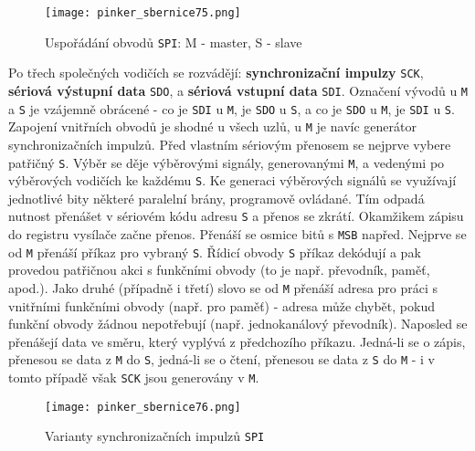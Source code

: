         \begin{figure}[ht!] %
          \centering
          \texttt{[image: pinker\_sbernice75.png]}
          \caption{Uspořádání obvodů \texttt{SPI}: M - master, S - slave}
          \label{MIT:fig_sbernice75}
        \end{figure}
        
        Po třech společných vodičích se rozvádějí: \textbf{synchronizační impulzy} \texttt{SCK}, 
        \textbf{sériová výstupní data} \texttt{SDO}, a \textbf{sériová vstup\-ní data} 
        \texttt{SDI}. Označení vývodů u \texttt{M} a \texttt{S} je vzájemně obrácené - co je 
        \texttt{SDI} u \texttt{M}, je \texttt{SDO} u \texttt{S}, a co je \texttt{SDO} u \texttt{M}, 
        je \texttt{SDI} u \texttt{S}. Zapojení vnitřních obvodů je shodné u všech uzlů, u 
        \texttt{M} je navíc generátor synchronizačních impulzů.  Před vlastním sériovým přenosem se 
        nejprve vybere patřičný \texttt{S}. Výběr se děje výběrovými signály, generovanými 
        \texttt{M}, a vedenými po výběrových vodičích ke každému \texttt{S}. Ke generaci výběrových 
        signálů se využívají jednotlivé bity některé paralelní brány, programově ovládané. Tím 
        odpadá nutnost přenášet v sériovém kódu adresu \texttt{S} a přenos se zkrátí. Okamžikem 
        zápisu do registru vysílače začne přenos. Přenáší se osmice bitů s \texttt{MSB} napřed. 
        Nejprve se od \texttt{M} přenáší příkaz pro vybraný \texttt{S}. Řídicí obvody \texttt{S} 
        příkaz dekódují a pak provedou patřičnou akci s funkčními obvody (to je např. převodník, 
        paměť, apod.). Jako druhé (případně i třetí) slovo se od \texttt{M} přenáší adresa pro 
        práci s vnitřními funkčními obvody (např. pro paměť) - adresa může chybět, pokud funkční 
        obvody žádnou nepotřebují (např. jednokanálový převodník). Naposled se přenášejí data ve 
        směru, který vyplývá z předchozího příkazu. Jedná-li se o zápis, přenesou se data z 
        \texttt{M} do \texttt{S}, jedná-li se o čtení, přenesou se data z \texttt{S} do \texttt{M} 
        - i v tomto případě však \texttt{SCK} jsou generovány v \texttt{M}.

        \begin{figure}[ht!] %
          \centering
          \texttt{[image: pinker\_sbernice76.png]}
          \caption{Varianty synchronizačních impulzů \texttt{SPI}}
          \label{MIT:fig_sbernice76}
        \end{figure}
        
